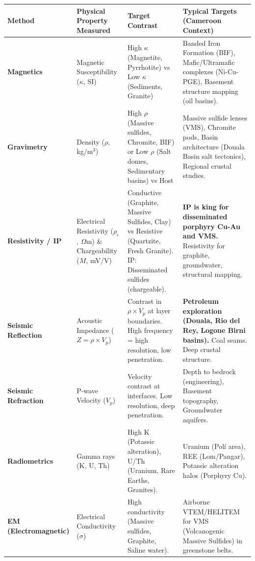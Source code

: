 \documentclass[11pt]{article}
\begin{document}
\begin{propriete}
\begin{center}
\begin{tabularx}{\linewidth}{|l|X|X|X|}\hline
\rowcolor{popblueL} \textbf{Method} & \textbf{Physical Property Measured} & \textbf{Target Contrast} & \textbf{Typical Targets (Cameroon Context)} \\ \hline
\textbf{Magnetics} & Magnetic Susceptibility ($\kappa$, SI) & High $\kappa$ (Magnetite, Pyrrhotite) vs Low $\kappa$ (Sediments, Granite) & Banded Iron Formation (BIF), Mafic/Ultramafic complexes (Ni-Cu-PGE), Basement structure mapping (oil basins). \\ \hline
\textbf{Gravimetry} & Density ($\rho$, kg/m$^3$) & High $\rho$ (Massive sulfides, Chromite, BIF) or Low $\rho$ (Salt domes, Sedimentary basins) vs Host & Massive sulfide lenses (VMS), Chromite pods, Basin architecture (Douala Basin salt tectonics), Regional crustal studies. \\ \hline
\textbf{Resistivity / IP} & Electrical Resistivity ($\rho_e$, $\Omega$m) \& Chargeability ($M$, mV/V) & Conductive (Graphite, Massive Sulfides, Clay) vs Resistive (Quartzite, Fresh Granite). IP: Disseminated sulfides (chargeable). & \textbf{IP is king for disseminated porphyry Cu-Au and VMS.} Resistivity for graphite, groundwater, structural mapping. \\ \hline
\textbf{Seismic Reflection} & Acoustic Impedance ($Z = \rho \times V_p$) & Contrast in $\rho \times V_p$ at layer boundaries. High frequency = high resolution, low penetration. & \textbf{Petroleum exploration (Douala, Rio del Rey, Logone Birni basins).} Coal seams. Deep crustal structure. \\ \hline
\textbf{Seismic Refraction} & P-wave Velocity ($V_p$) & Velocity contrast at interfaces. Low resolution, deep penetration. & Depth to bedrock (engineering), Basement topography, Groundwater aquifers. \\ \hline
\textbf{Radiometrics} & Gamma rays (K, U, Th) & High K (Potassic alteration), U/Th (Uranium, Rare Earths, Granites). & Uranium (Polí area), REE (Lom/Pangar), Potassic alteration halos (Porphyry Cu). \\ \hline
\textbf{EM (Electromagnetic)} & Electrical Conductivity ($\sigma$) & High conductivity (Massive sulfides, Graphite, Saline water). & Airborne VTEM/HELITEM for VMS (Volcanogenic Massive Sulfides) in greenstone belts. \\ \hline
\end{tabularx}
\end{center}
\end{propriete}
\end{document}
